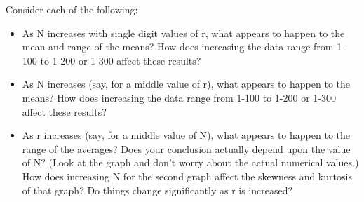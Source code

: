 \documentclass[10pt,]{book}
\theoremstyle{plain}
\theoremstyle{definition}
\theoremstyle{definition}
\theoremstyle{definition}
\numberwithin{equation}{section}
\begin{document}
Consider each of the following:
\leavevmode%
\begin{itemize}[label=\textbullet]
\item{}
As N increases with single digit values of r, what appears to happen to the mean and range of the means?  How does increasing the data range from 1-100 to 1-200 or 1-300 affect these results?%
\item{}As N increases (say, for a middle value of r), what appears to happen to the means?  How does increasing the data range from 1-100 to 1-200 or 1-300 affect these results?%
\item{}As r increases (say, for a middle value of N), what appears to happen to the range of the averages?  Does your conclusion actually depend upon the value of N?  (Look at the graph and don't worry about the actual numerical values.)
How does increasing N for the second graph affect the skewness and kurtosis of that graph?  Do things change significantly as r is increased?  %
\end{itemize}
\end{document}

